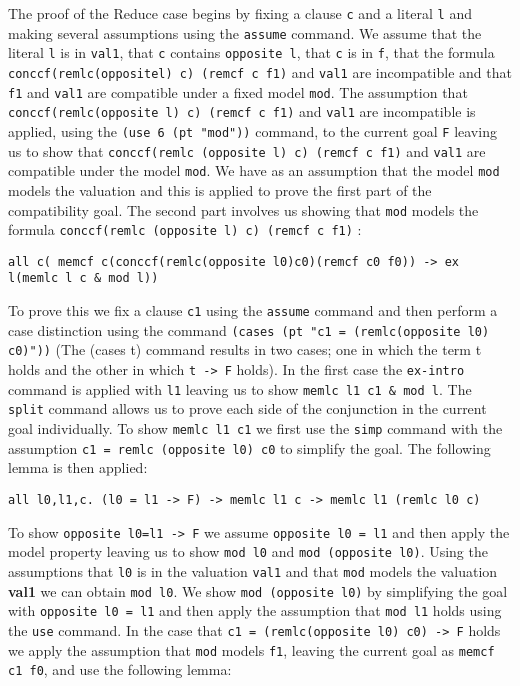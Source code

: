 The proof of the Reduce case begins by fixing a clause \texttt{c} and a literal \texttt{l} and making several assumptions using the \texttt{assume} command. We assume that the literal \texttt{l} is in \texttt{val1}, that \texttt{c} contains \texttt{opposite l}, that \texttt{c} is in \texttt{f}, that the formula \texttt{conccf(remlc(oppositel) c) (remcf c f1)} and \texttt{val1} are incompatible and that \texttt{f1} and \texttt{val1} are compatible under a fixed model \texttt{mod}. The assumption that \texttt{conccf(remlc(opposite l) c) (remcf c f1)} and \texttt{val1} are incompatible is applied, using the \texttt{(use 6 (pt "mod"))} command, to the current goal \texttt{F} leaving us to show that \texttt{conccf(remlc (opposite l) c) (remcf c f1)}  and \texttt{val1} are compatible under the model \texttt{mod}. We have as an assumption that the model \texttt{mod} models the valuation and this is applied to prove the first part of the compatibility goal. The second part involves us showing that \texttt{mod} models the formula \texttt{conccf(remlc (opposite l) c) (remcf c f1)} :
\begin{center}
\texttt{all c(
      memcf c(conccf(remlc(opposite l0)c0)(remcf c0 f0)) ->
      ex l(memlc l c \& mod l))}
\end{center}

To prove this we fix a clause \texttt{c1} using the \texttt{assume} command and then perform a case distinction using the command \texttt{(cases (pt "c1 = (remlc(opposite l0) c0)"))} (The (cases t) command results in two cases; one in which the term t holds and the other in which \texttt{t -> F} holds).  In the first case the \texttt{ex-intro} command is applied with \texttt{l1} leaving us to show \texttt{memlc l1 c1 \& mod l}. The \texttt{split} command allows us to prove each side of the conjunction in the current goal individually. To show \texttt{memlc l1 c1} we first use the \texttt{simp} command with the assumption \texttt{c1 = remlc (opposite l0) c0} to simplify the goal. The following lemma is then applied:
\begin{center}
\texttt{all l0,l1,c.  (l0 = l1 -> F) -> memlc l1 c -> memlc l1 (remlc l0 c)}
\end{center}

To show \texttt{opposite l0=l1 -> F} we assume \texttt{opposite l0 = l1} and then apply the model property leaving us to show \texttt{mod l0} and \texttt{mod (opposite l0)}. Using the assumptions that \texttt{l0} is in the valuation \texttt{val1} and that \texttt{mod} models the valuation \textbf{val1} we can obtain \texttt{mod l0}. We show \texttt{mod (opposite l0)} by simplifying the goal with \texttt{opposite l0 = l1} and then apply the assumption that \texttt{mod l1} holds using the \texttt{use} command.  In the case that \texttt{c1 = (remlc(opposite l0) c0) -> F} holds we apply the assumption that \texttt{mod} models \texttt{f1}, leaving the current goal as \texttt{memcf c1 f0}, and use the following lemma:

